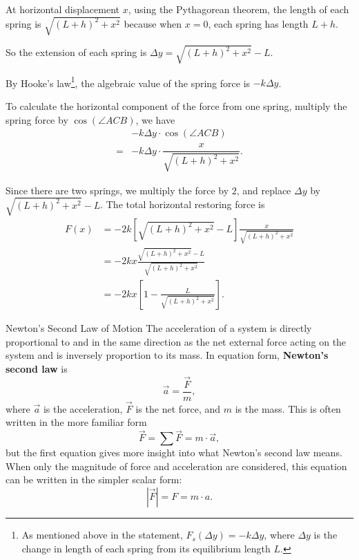 \documentclass[12pt, a4paper]{report}
\begin{document}
	At horizontal displacement $x$, using the Pythagorean theorem, the length of each spring is $\sqrt{(L + h)^2 + x^2}$ because when $x = 0$, each spring has length $L + h$.
	
	So the extension of each spring is $\Delta y = \sqrt{(L + h)^2 + x^2} - L$.
	
	By Hooke’s law\footnote{As mentioned above in the statement, $F_s(\Delta y) = -k\Delta y$, where $\Delta y$ is the change in length of each spring from its equilibrium length $L$.}, the algebraic value of the spring force is $-k \Delta y$.
	
	To calculate the horizontal component of the force from one spring, multiply the spring force by $\cos{(\angle ACB)}$, we have
	\begin{align*}
		&-k \Delta y \cdot \cos{(\angle ACB)} \\
		= &-k \Delta y \cdot \dfrac{x}{\sqrt{(L + h)^2 + x^2}}.
	\end{align*}
	
	Since there are two springs, we multiply the force by $2$, and replace $\Delta y$ by $\sqrt{(L + h)^2 + x^2} - L$. The total horizontal restoring force is
	\begin{align*}
		F(x) &= -2k \left[\sqrt{(L + h)^2 + x^2} - L\right] \frac{x}{\sqrt{(L + h)^2 + x^2}} \\
		&= -2kx \frac{\sqrt{(L + h)^2 + x^2} - L}{\sqrt{(L + h)^2 + x^2}} \\
		&= -2kx \left[1 - \frac{L}{\sqrt{(L + h)^2 + x^2}}\right].
	\end{align*}
	
	\begin{mytheo}{Newton's Second Law of Motion {}}{}
		The acceleration of a system is directly proportional to and in the same direction as the net external force acting on the system and is inversely proportion to its mass. In equation form, \textbf{Newton's second law} is
		\begin{equation*}
			\vec{a} = \dfrac{\vec{F}}{m},
		\end{equation*}
		where $\vec{a}$ is the acceleration, $\vec{F}$ is the net force, and $m$ is the mass. This is often written in the more familiar form
		\begin{equation*}
			\vec{F} = \sum \vec{F} = m \cdot \vec{a},
		\end{equation*}
		but the first equation gives more insight into what Newton's second law means. When only the magnitude of force and acceleration are considered, this equation can be written in the simpler scalar form:
		\begin{equation*}
			\left|\vec{F}\right| = F = m \cdot a.
		\end{equation*}
	\end{mytheo}
	
\end{document}
